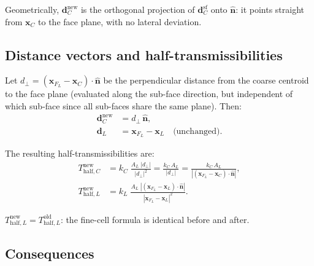 \documentclass[11pt,a4paper]{article}
\begin{document}
Geometrically, $\mathbf{d}_C^{\text{new}}$ is the orthogonal projection
of $\mathbf{d}_C^{\text{sf}}$ onto $\hat{\mathbf{n}}$: it points straight
from $\mathbf{x}_C$ to the face plane, with no lateral deviation.

\subsection*{Distance vectors and half-transmissibilities}

Let $d_\perp = (\mathbf{x}_{F_L} - \mathbf{x}_C)\cdot\hat{\mathbf{n}}$
be the perpendicular distance from the coarse centroid to the face plane
(evaluated along the sub-face direction, but independent of which sub-face
since all sub-faces share the same plane).  Then:
\begin{align}
  \mathbf{d}_C^{\text{new}} &= d_\perp\,\hat{\mathbf{n}},
  \label{eq:dnew_C}\\[4pt]
  \mathbf{d}_L              &= \mathbf{x}_{F_L} - \mathbf{x}_L
  \quad\text{(unchanged)}.
  \label{eq:dnew_L}
\end{align}

The resulting half-transmissibilities are:
\begin{align}
  T_{\text{half},C}^{\text{new}}
    &= k_C\;\frac{A_L\;|d_\perp|}{|d_\perp|^2}
     = \frac{k_C\,A_L}{|d_\perp|}
     = \frac{k_C\,A_L}
            {|(\mathbf{x}_{F_L}-\mathbf{x}_C)\cdot\hat{\mathbf{n}}|},
  \label{eq:Tnew_C}\\[6pt]
  T_{\text{half},L}^{\text{new}}
    &= k_L\;\frac{A_L\;
       |(\mathbf{x}_{F_L}-\mathbf{x}_L)\cdot\hat{\mathbf{n}}|}
       {|\mathbf{x}_{F_L}-\mathbf{x}_L|^{2}}.
  \label{eq:Tnew_L}
\end{align}

\noindent
$T_{\text{half},L}^{\text{new}} = T_{\text{half},L}^{\text{old}}$:
the fine-cell formula is identical before and after.

\subsection*{Consequences}
\end{document}
